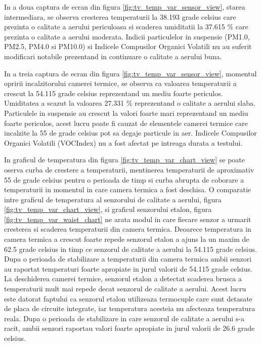 In a doua captura de ecran din figura \ref{fig:tv_temp_var_sensor_view}, starea intermediara, se observa cresterea temperaturii la 38.193 grade celsius care prezinta o calitate a aerului periculoasa si scaderea umiditatii 
la 37.615 \% care prezinta o calitate a aerului moderata. Indicii particulelor in suspensie (PM1.0, PM2.5, PM4.0 si PM10.0) si Indicele Compusilor Organici Volatili 
nu au suferit modificari notabile prezentand in continuare o calitate a aerului buna.

In a treia captura de ecran din figura \ref{fig:tv_temp_var_sensor_view}, momentul opririi incalzitorului camerei termice, se observa ca valoarea temperaturii a crescut la 54.115 grade celsius reprezentand un mediu foarte 
periculos. Umiditatea a scazut la valoarea 27.331 \% reprezentand o calitate a aerului slaba. Particulele in suspensie au crescut la valori foarte mari reprezentand un 
mediu foarte periculos, acest lucru poate fi cauzat de elementele camerei termice care incalzite la 55 de grade celsius pot sa degaje particule in aer. Indicele Compusilor 
Organici Volatili (VOCIndex) nu a fost afectat pe intreaga durata a testului.

In graficul de temperatura din figura \ref{fig:tv_temp_var_chart_view} se poate oserva curba de crestere a temperaturii, mentinerea temperaturii de aproximativ 55 de 
grade celsius pentru o perioada de timp si curba abrupta de coborare a temperaturii in momentul in care camera termica a fost deschisa. O comparatie intre graficul de 
temperatura al senzorului de calitate a aerului, figura \ref{fig:tv_temp_var_chart_view}, si graficul senzorului etalon, figura \ref{fig:tv_temp_var_waist_chart} ne 
arata modul in care fiecare senzor a urmarit cresterea si scaderea temperaturii din camera termica. Deoarece temperatura in camera termica a crescut foarte repede senzorul 
etalon a ajuns la un maxim de 62.5 grade celsius in timp ce senzorul de calitate a aerului la 54.115 grade celsius. Dupa o perioada de stabilizare a temperaturii din 
camera termica ambii senzori au raportat temperaturi foarte apropiate in jurul valorii de 54.115 grade celsius. La deschiderea camerei termice, senzorul etalon a detectat 
scaderea brusca a temperaturii mult mai repede decat senzorul de calitate a aerului. Acest lucru este datorat faptului ca senzorul etalon utilizeaza termocuple care sunt 
detasate de placa de circuite integrate, iar temperatura acesteia nu afecteaza temperatura reala. Dupa o perioada de stabilizare in care senzorul de calitate a aerului s-a 
racit, ambii senzori raportau valori foarte apropiate in jurul valorii de 26.6 grade celsius.


